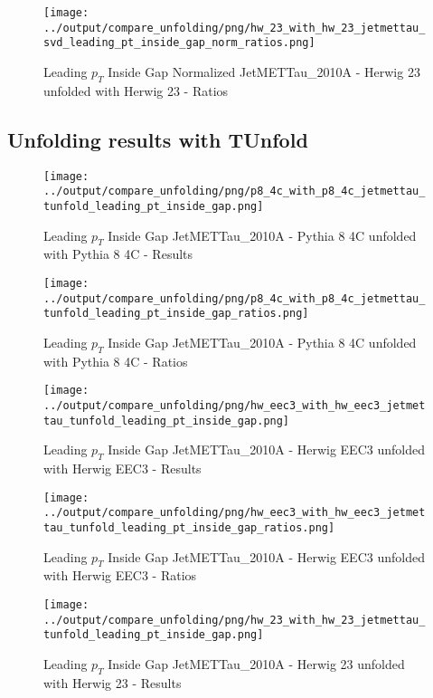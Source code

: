 \documentclass[11pt]{book}
\begin{document}
\begin{figure}[ht]
\centering
\texttt{[image: ../output/compare\_unfolding/png/hw\_23\_with\_hw\_23\_jetmettau\_svd\_leading\_pt\_inside\_gap\_norm\_ratios.png]}
\caption{Leading $p_{T}$ Inside Gap Normalized JetMETTau\_2010A - Herwig 23 unfolded with Herwig 23 - Ratios}
\label{hw_23_hw_23_jetmettau_svd_leading_pt_inside_gap_norm_b}
\end{figure}


\clearpage
\subsection{Unfolding results with TUnfold}

\begin{figure}[ht]
\centering
\texttt{[image: ../output/compare\_unfolding/png/p8\_4c\_with\_p8\_4c\_jetmettau\_tunfold\_leading\_pt\_inside\_gap.png]}
\caption{Leading $p_{T}$ Inside Gap JetMETTau\_2010A - Pythia 8 4C unfolded with Pythia 8 4C - Results}
\label{p8_p8_jetmettau_tunfold_leading_pt_inside_gap_a}
\end{figure}

\begin{figure}[ht]
\centering
\texttt{[image: ../output/compare\_unfolding/png/p8\_4c\_with\_p8\_4c\_jetmettau\_tunfold\_leading\_pt\_inside\_gap\_ratios.png]}
\caption{Leading $p_{T}$ Inside Gap JetMETTau\_2010A - Pythia 8 4C unfolded with Pythia 8 4C - Ratios}
\label{p8_p8_jetmettau_tunfold_leading_pt_inside_gap_b}
\end{figure}

\begin{figure}[ht]
\centering
\texttt{[image: ../output/compare\_unfolding/png/hw\_eec3\_with\_hw\_eec3\_jetmettau\_tunfold\_leading\_pt\_inside\_gap.png]}
\caption{Leading $p_{T}$ Inside Gap JetMETTau\_2010A - Herwig EEC3 unfolded with Herwig EEC3 - Results}
\label{hw_eec3_hw_eec3_jetmettau_tunfold_leading_pt_inside_gap_a}
\end{figure}

\begin{figure}[ht]
\centering
\texttt{[image: ../output/compare\_unfolding/png/hw\_eec3\_with\_hw\_eec3\_jetmettau\_tunfold\_leading\_pt\_inside\_gap\_ratios.png]}
\caption{Leading $p_{T}$ Inside Gap JetMETTau\_2010A - Herwig EEC3 unfolded with Herwig EEC3 - Ratios}
\label{hw_eec3_hw_eec3_jetmettau_tunfold_leading_pt_inside_gap_b}
\end{figure}

\begin{figure}[ht]
\centering
\texttt{[image: ../output/compare\_unfolding/png/hw\_23\_with\_hw\_23\_jetmettau\_tunfold\_leading\_pt\_inside\_gap.png]}
\caption{Leading $p_{T}$ Inside Gap JetMETTau\_2010A - Herwig 23 unfolded with Herwig 23 - Results}
\label{hw_23_hw_23_jetmettau_tunfold_leading_pt_inside_gap_a}
\end{figure}
\end{document}
